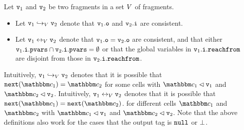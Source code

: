 Let $\mathtt{v}_1$ and $\mathtt{v}_2$ be two fragments in a set $V$ of fragments.
\begin{itemize}
\item  Let $\mathtt{v}_1 \hookrightarrow_{V} \mathtt{v}_2$ denote that $\mathtt{v}_1.\mathtt{o}$   and $\mathtt{v}_2.\mathtt{i}$ are consistent.
\item  Let $\mathtt{v}_1 \leftrightarrow_{V} \mathtt{v}_2$ denote that $\mathtt{v}_1.\mathtt{o} = \mathtt{v}_2.\mathtt{o}$ are consistent, and that either
  $\mathtt{v}_1.\mathtt{i}.\mathtt{pvars} \cap \mathtt{v}_2.\mathtt{i}.\mathtt{pvars} = \emptyset$ or that
  the global variables in  $\mathtt{v}_1.\mathtt{i}.\mathtt{reachfrom}$ are disjoint from
  those in $\mathtt{v}_2.\mathtt{i}.\mathtt{reachfrom}$.
\end{itemize}
Intuitively, $\mathtt{v}_1 \hookrightarrow_{V} \mathtt{v}_2$ denotes that it is
possible that  $\mathtt{next}(\cell_1) = \cell_2$ for some cells with
  $\cell_1 \lhd \frag_1$ and  $\cell_2 \lhd \frag_2$.
Intuitively, $\mathtt{v}_1 \leftrightarrow_{V} \mathtt{v}_2$ denotes that it is
possible that
  $\mathtt{next}(\cell_1) = \mathtt{next}(\cell_2)$.
for different cells  $\cell_1$ and $\cell_2$ with
  $\cell_1 \lhd \frag_1$ and  $\cell_2 \lhd \frag_2$.
Note that the above definitions also work for the cases that the output tag is
${\tt null}$ or $\bot$.

